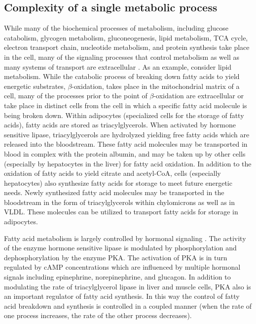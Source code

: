 \begin{DoubleSpace*}
\section{Complexity of a single metabolic process}
While many of the biochemical processes of metabolism, including glucose catabolism, glycogen metabolism, gluconeogenesis, lipid metabolism, TCA cycle, electron transport chain, nucleotide metabolism, and protein synthesis  take place in the cell, many of the signaling processes that control metabolism as well as many systems of transport are extracellular \cite{voet2013}. As an example, consider lipid metabolism. While the catabolic process of breaking down fatty acids to yield energetic substrates, $\beta$-oxidation, takes place in the mitochondrial matrix of a cell, many of the processes prior to the point of $\beta$-oxidation are extracellular or take place in distinct cells from the cell in which a specific fatty acid molecule is being broken down. Within adipocytes (specialized cells for the storage of fatty acids), fatty acids are stored as triacylglycerols. When activated by hormone sensitive lipase, triacylglycerols are hydrolyzed yielding free fatty acids which are released into the bloodstream. These fatty acid molecules may be transported in blood in complex with the protein albumin, and may be taken up by other cells (especially by hepatocytes in the liver) for fatty acid oxidation. In addition to the oxidation of fatty acids to yield citrate and acetyl-CoA, cells (especially hepatocytes) also synthesize fatty acids for storage to meet future energetic needs. Newly synthesized fatty acid molecules may be transported in the bloodstream in the form of triacylglycerols within chylomicrons as well as in VLDL. These molecules can be utilized to transport fatty acids for storage in adipocytes. 

Fatty acid metabolism is largely controlled by hormonal signaling \cite{voet2013}. The activity of the enzyme hormone sensitive lipase is modulated by phosphorylation and dephosphorylation by the enzyme PKA. The activation of PKA is in turn regulated by cAMP concentrations which are influenced by multiple hormonal signals including epinephrine, norepinephrine, and glucagon. In addition to modulating the rate of triacylglycerol lipase in liver and muscle cells, PKA also is an important regulator of fatty acid synthesis. In this way the control of fatty acid breakdown and synthesis is controlled in a coupled manner (when the rate of one process increases, the rate of the other process decreases).


\end{DoubleSpace*}
